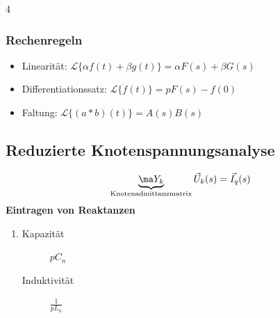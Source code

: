 \documentclass[fs, footer]{latex4ei}
\begin{document}
\begin{multicols*}{4}
        \subsubsection{Rechenregeln}
        \begin{itemize}
        \item Linearität: $\mathcal L\{\alpha f(t) + \beta g(t)\} = \alpha F(s) + \beta G(s)$
        \item Differentiationssatz: $\mathcal L\{\dot f(t)\} = pF(s) - f(0)$
        \item Faltung: $\mathcal L\{(a * b)(t)\} = A(s)B(s)$
        \end{itemize}

        \subsection{Reduzierte Knotenspannungsanalyse}
        \begin{equation*}
            \underbrace{\ma Y_k}_{\text{Knotenadmittanzmatrix}}\vec U_k(s)=\vec I_q(s)
        \end{equation*}
        \textbf{Eintragen von Reaktanzen}
        \begin{enumerate}
        \item[] \begin{description}
        \item[Kapazität] $pC_n$
        \item[Induktivität] $\frac{1}{pL_n}$
        \end{description}
        \end{enumerate}


\end{multicols*}
\end{document}
